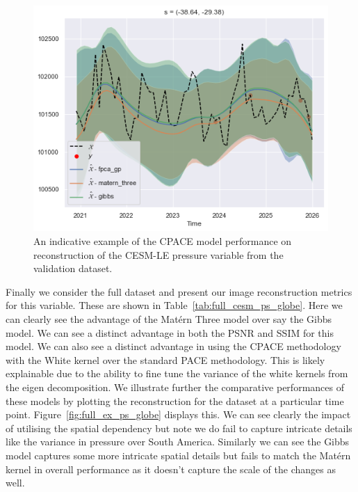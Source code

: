 \begin{figure}
	\centering
	\includegraphics[width=\textwidth]{train_ex_ps_globe}
	\caption[An indicative example of the CPACE model performance on reconstruction of the CESM-LE pressure variable from the validation dataset.]{An indicative example of the CPACE model performance on reconstruction of the CESM-LE pressure variable from the validation dataset.}
	\label{fig:train_ex_ps_globe}
\end{figure}

Finally we consider the full dataset and present our image reconstruction metrics for this variable.
These are shown in Table~\ref{tab:full_cesm_ps_globe}.
Here we can clearly see the advantage of the Mat\'ern Three model over say the Gibbs model.
We can see a distinct advantage in both the PSNR and SSIM for this model.
We can also see a distinct advantage in using the CPACE methodology with the White kernel over the standard PACE methodology.
This is likely explainable due to the ability to fine tune the variance of the white kernels from the eigen decomposition. 
We illustrate further the comparative performances of these models by plotting the reconstruction for the dataset at a particular time point.
Figure~\ref{fig:full_ex_ps_globe} displays this.
We can see clearly the impact of utilising the spatial dependency but note we do fail to capture intricate details like the variance in pressure over South America.
Similarly we can see the Gibbs model captures some more intricate  spatial details but fails to match the Mat\'ern kernel in overall performance as it doesn't capture the scale of the changes as well. 


